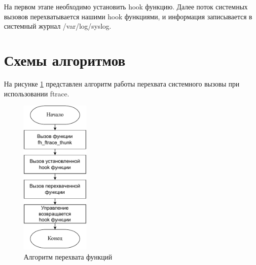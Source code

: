 На первом этапе необходимо установить hook функцию. Далее поток системных вызовов перехватывается нашими hook функциями, и информация записывается в системный журнал /var/log/syslog.

\newpage
\section{Схемы алгоритмов}


На рисунке \ref{alg1} представлен алгоритм работы перехвата системного
вызовы при использовании ftrace.

\begin{figure}[h!]
	\centering
	\includegraphics[width=0.3\textwidth]{inc/alg1.drawio.pdf}
	\caption{Алгоритм перехвата функций}
	\label{alg1}
\end{figure}

